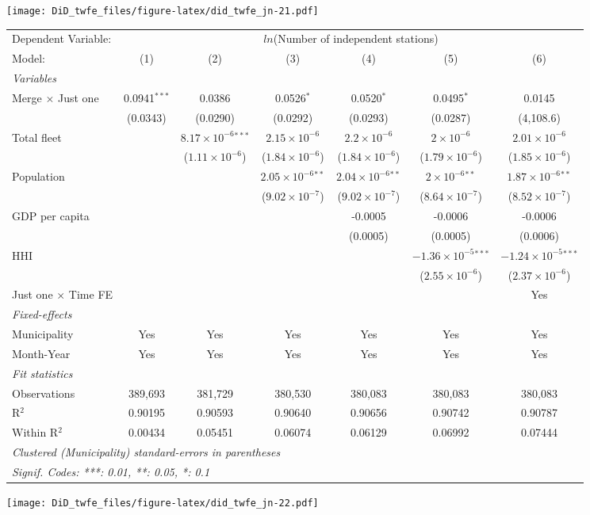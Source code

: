 \documentclass[
]{article}
\begin{document}
\texttt{[image: DiD\_twfe\_files/figure-latex/did\_twfe\_jn-21.pdf]}

\begin{tabular}{lcccccc}
\tabularnewline\midrule\midrule
Dependent Variable:&\multicolumn{6}{c}{$ln$(Number of independent stations)}\\
Model:&(1) & (2) & (3) & (4) & (5) & (6)\\
\midrule \emph{Variables}&   &   &   &   &   &  \\
Merge $\times $ Just one & 0.0941$^{***}$ & 0.0386 & 0.0526$^{*}$ & 0.0520$^{*}$ & 0.0495$^{*}$ & 0.0145\\
  &(0.0343) & (0.0290) & (0.0292) & (0.0293) & (0.0287) & (4,108.6)\\
Total fleet &    & $8.17\times 10^{-6}$$^{***}$ & $2.15\times 10^{-6}$ & $2.2\times 10^{-6}$ & $2\times 10^{-6}$ & $2.01\times 10^{-6}$\\
  &   & ($1.11\times 10^{-6}$) & ($1.84\times 10^{-6}$) & ($1.84\times 10^{-6}$) & ($1.79\times 10^{-6}$) & ($1.85\times 10^{-6}$)\\
Population &    &    & $2.05\times 10^{-6}$$^{**}$ & $2.04\times 10^{-6}$$^{**}$ & $2\times 10^{-6}$$^{**}$ & $1.87\times 10^{-6}$$^{**}$\\
  &   &    & ($9.02\times 10^{-7}$) & ($9.02\times 10^{-7}$) & ($8.64\times 10^{-7}$) & ($8.52\times 10^{-7}$)\\
GDP per capita &    &    &    & -0.0005 & -0.0006 & -0.0006\\
  &   &    &    & (0.0005) & (0.0005) & (0.0006)\\
HHI &    &    &    &    & $-1.36\times 10^{-5}$$^{***}$ & $-1.24\times 10^{-5}$$^{***}$\\
  &   &    &    &    & ($2.55\times 10^{-6}$) & ($2.37\times 10^{-6}$)\\
Just one $\times$ Time FE &  &  &  &  &  & Yes\\
\midrule \emph{Fixed-effects}&   &   &   &   &   &  \\
Municipality & Yes & Yes & Yes & Yes & Yes & Yes\\
Month-Year & Yes & Yes & Yes & Yes & Yes & Yes\\
\midrule \emph{Fit statistics}&  & & & & & \\
Observations & 389,693&381,729&380,530&380,083&380,083&380,083\\
R$^2$ & 0.90195&0.90593&0.90640&0.90656&0.90742&0.90787\\
Within R$^2$ & 0.00434&0.05451&0.06074&0.06129&0.06992&0.07444\\
\midrule\midrule\multicolumn{7}{l}{\emph{Clustered (Municipality) standard-errors in parentheses}}\\
\multicolumn{7}{l}{\emph{Signif. Codes: ***: 0.01, **: 0.05, *: 0.1}}\\
\end{tabular}

\texttt{[image: DiD\_twfe\_files/figure-latex/did\_twfe\_jn-22.pdf]}
\end{document}

